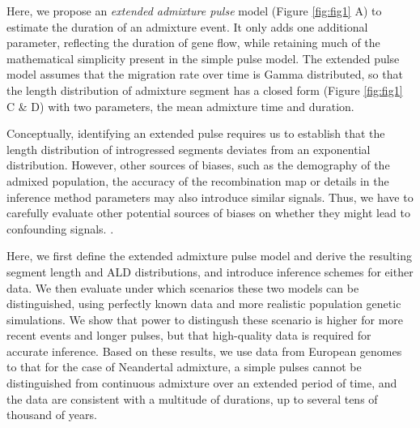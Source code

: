 \documentclass[11pt]{article}
\begin{document}
Here, we propose an \emph{extended admixture pulse} model (Figure \ref{fig:fig1} A) to estimate the duration of an admixture event. It only adds one additional parameter, reflecting the duration of gene flow, while retaining much of the mathematical simplicity present in the simple pulse model. 
The extended pulse model assumes that the migration rate over time is Gamma distributed, so that the length distribution of admixture segment has a closed form (Figure \ref{fig:fig1} C \& D) with two parameters, the mean admixture time and duration.

Conceptually, identifying an extended pulse requires us to establish that the length distribution of introgressed segments deviates from an exponential distribution. However, other sources of biases, such as the demography of the admixed population, the accuracy of the recombination map or details in the inference method parameters may also introduce similar signals. Thus, we have to carefully evaluate other potential sources of biases on whether they might lead to confounding signals. \citep{sankararaman_date_2012,fu_genome_2014,moorjani_genetic_2016}. 



Here, we first define the extended admixture pulse model and derive the resulting segment length and ALD distributions, and introduce inference schemes for either data. We then evaluate under which scenarios these two models can be distinguished, using  perfectly known data and more realistic population genetic simulations.  We show that power to distingush these scenario is higher for more recent events and longer pulses, but that high-quality data is required for accurate inference. Based on these results, we use  data from European genomes  \citep{the_1000_genomes_project_consortium_global_2015} to that  for the  case of Neandertal admixture, a simple pulses cannot be distinguished from continuous admixture over an extended period of time, and the data are consistent with a multitude of durations, up to several tens of thousand of years.
\end{document}
